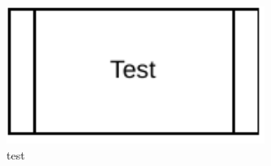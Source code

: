 \begin{figure}[!htbp]
    \centering
    \includegraphics[width=0.75\textwidth]{img/diagrams/pdf/test.drawio.pdf}
    \caption[test Overview]{test}
    \label{fig:test.drawio.pdf}
\end{figure}
    